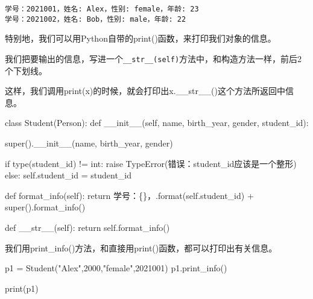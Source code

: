 \documentclass[
  letterpaper,
  DIV=11,
  numbers=noendperiod]{scrreprt}
\newenvironment{Shaded}{\begin{snugshade}}{\end{snugshade}}
\newcommand{\BuiltInTok}[1]{\textcolor[rgb]{0.00,0.23,0.31}{#1}}
\newcommand{\ControlFlowTok}[1]{\textcolor[rgb]{0.00,0.23,0.31}{#1}}
\newcommand{\DecValTok}[1]{\textcolor[rgb]{0.68,0.00,0.00}{#1}}
\newcommand{\FunctionTok}[1]{\textcolor[rgb]{0.28,0.35,0.67}{#1}}
\newcommand{\KeywordTok}[1]{\textcolor[rgb]{0.00,0.23,0.31}{#1}}
\newcommand{\NormalTok}[1]{\textcolor[rgb]{0.00,0.23,0.31}{#1}}
\newcommand{\OperatorTok}[1]{\textcolor[rgb]{0.37,0.37,0.37}{#1}}
\newcommand{\PreprocessorTok}[1]{\textcolor[rgb]{0.68,0.00,0.00}{#1}}
\newcommand{\SpecialCharTok}[1]{\textcolor[rgb]{0.37,0.37,0.37}{#1}}
\newcommand{\StringTok}[1]{\textcolor[rgb]{0.13,0.47,0.30}{#1}}
\newcommand{\VariableTok}[1]{\textcolor[rgb]{0.07,0.07,0.07}{#1}}
\begin{document}
\begin{verbatim}
学号：2021001，姓名: Alex，性别: female，年龄: 23
学号：2021002，姓名: Bob，性别: male，年龄: 22
\end{verbatim}

特别地，我们可以用Python自带的print()函数，来打印我们对象的信息。

我们把要输出的信息，写进一个\texttt{\_\_str\_\_(self)}方法中，和构造方法一样，前后2个下划线。

这样，我们调用print(x)的时候，就会打印出x.\_\_str\_\_()这个方法所返回中信息。

\begin{Shaded}
\begin{Highlighting}[]
\KeywordTok{class}\NormalTok{ Student(Person):}
    \KeywordTok{def} \FunctionTok{\_\_init\_\_}\NormalTok{(}\VariableTok{self}\NormalTok{, name, birth\_year, gender, student\_id):}
        
        \BuiltInTok{super}\NormalTok{().}\FunctionTok{\_\_init\_\_}\NormalTok{(name, birth\_year, gender)}
        
        \ControlFlowTok{if} \BuiltInTok{type}\NormalTok{(student\_id) }\OperatorTok{!=} \BuiltInTok{int}\NormalTok{:}
            \ControlFlowTok{raise} \PreprocessorTok{TypeError}\NormalTok{(}\StringTok{\textquotesingle{}错误：student\_id应该是一个整形\textquotesingle{}}\NormalTok{)}
        \ControlFlowTok{else}\NormalTok{:}
            \VariableTok{self}\NormalTok{.student\_id }\OperatorTok{=}\NormalTok{ student\_id}

    \KeywordTok{def}\NormalTok{ format\_info(}\VariableTok{self}\NormalTok{):}
        \ControlFlowTok{return} \StringTok{\textquotesingle{}学号：}\SpecialCharTok{\{\}}\StringTok{，\textquotesingle{}}\NormalTok{.}\BuiltInTok{format}\NormalTok{(}\VariableTok{self}\NormalTok{.student\_id) }\OperatorTok{+} \BuiltInTok{super}\NormalTok{().format\_info()}
    
    \KeywordTok{def} \FunctionTok{\_\_str\_\_}\NormalTok{(}\VariableTok{self}\NormalTok{):}
        \ControlFlowTok{return} \VariableTok{self}\NormalTok{.format\_info()}
\end{Highlighting}
\end{Shaded}

我们用print\_info()方法，和直接用print()函数，都可以打印出有关信息。

\begin{Shaded}
\begin{Highlighting}[]
\NormalTok{p1 }\OperatorTok{=}\NormalTok{ Student(}\StringTok{"Alex"}\NormalTok{,}\DecValTok{2000}\NormalTok{,}\StringTok{"female"}\NormalTok{,}\DecValTok{2021001}\NormalTok{)}
\NormalTok{p1.print\_info()}

\BuiltInTok{print}\NormalTok{(p1)}
\end{Highlighting}
\end{Shaded}
\end{document}
